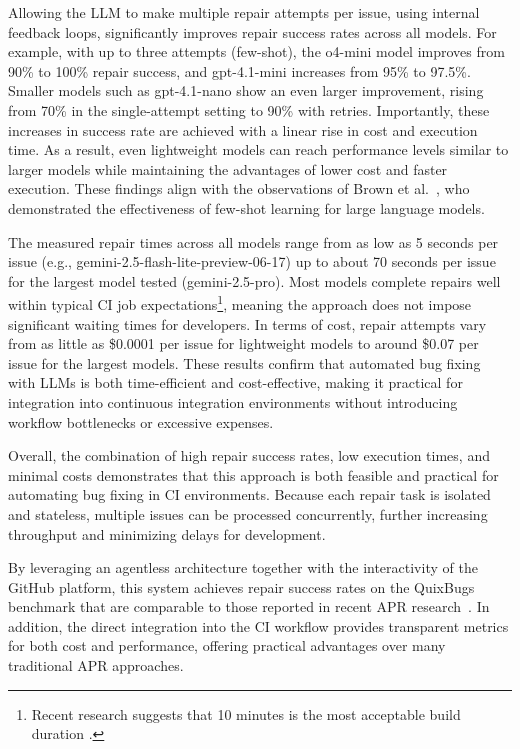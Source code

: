 Allowing the \ac{LLM} to make multiple repair attempts per issue, using internal feedback loops, significantly improves repair success rates across all models. For example, with up to three attempts (few-shot), the o4-mini model improves from 90\% to 100\% repair success, and gpt-4.1-mini increases from 95\% to 97.5\%. Smaller models such as gpt-4.1-nano show an even larger improvement, rising from 70\% in the single-attempt setting to 90\% with retries. Importantly, these increases in success rate are achieved with a linear rise in cost and execution time. As a result, even lightweight models can reach performance levels similar to larger models while maintaining the advantages of lower cost and faster execution. These findings align with the observations of Brown et al.~\cite{brownLanguageModelsAre2020}, who demonstrated the effectiveness of few-shot learning for large language models.

The measured repair times across all models range from as low as 5 seconds per issue (e.g., gemini-2.5-flash-lite-preview-06-17) up to about 70 seconds per issue for the largest model tested (gemini-2.5-pro). Most models complete repairs well within typical CI job expectations\footnote{Recent research suggests that 10 minutes is the most acceptable build duration \cite{hiltonTradeoffsContinuousIntegration2017}.}, meaning the approach does not impose significant waiting times for developers. In terms of cost, repair attempts vary from as little as \$0.0001 per issue for lightweight models to around \$0.07 per issue for the largest models. These results confirm that automated bug fixing with \acp{LLM} is both time-efficient and cost-effective, making it practical for integration into continuous integration environments without introducing workflow bottlenecks or excessive expenses.

Overall, the combination of high repair success rates, low execution times, and minimal costs demonstrates that this approach is both feasible and practical for automating bug fixing in CI environments. Because each repair task is isolated and stateless, multiple issues can be processed concurrently, further increasing throughput and minimizing delays for development.

By leveraging an agentless architecture together with the interactivity of the GitHub platform, this system achieves repair success rates on the QuixBugs benchmark that are comparable to those reported in recent APR research~\cite{huCanGPTO1Kill2024, }. In addition, the direct integration into the CI workflow provides transparent metrics for both cost and performance, offering practical advantages over many traditional APR approaches.


